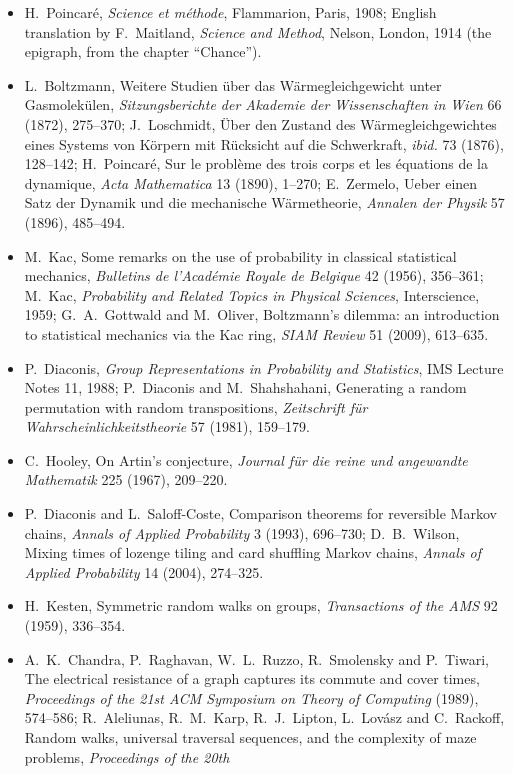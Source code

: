 \begin{itemize}
\item H.~Poincaré, \emph{Science et méthode}, Flammarion, Paris, 1908; English translation by F.~Maitland, \emph{Science and Method}, Nelson, London,
1914 (the epigraph, from the chapter ``Chance'').
\item L.~Boltzmann, Weitere Studien über das Wärmegleichgewicht unter Gasmolekülen, \emph{Sitzungsberichte der Akademie der Wissenschaften
in Wien} 66 (1872), 275--370; J.~Loschmidt, Über den Zustand des Wärmegleichgewichtes eines Systems von Körpern mit Rücksicht auf die
Schwerkraft, \emph{ibid.} 73 (1876), 128--142; H.~Poincaré, Sur le problème des trois corps et les équations de la dynamique, \emph{Acta
Mathematica} 13 (1890), 1--270; E.~Zermelo, Ueber einen Satz der Dynamik und die mechanische Wärmetheorie, \emph{Annalen der Physik} 57
(1896), 485--494.
\item M.~Kac, Some remarks on the use of probability in classical statistical mechanics, \emph{Bulletins de l'Académie Royale de Belgique} 42
(1956), 356--361; M.~Kac, \emph{Probability and Related Topics in Physical Sciences}, Interscience, 1959; G.~A.~Gottwald and M.~Oliver,
Boltzmann's dilemma: an introduction to statistical mechanics via the Kac ring, \emph{SIAM Review} 51 (2009), 613--635.
\item P.~Diaconis, \emph{Group Representations in Probability and Statistics}, IMS Lecture Notes 11, 1988; P.~Diaconis and M.~Shahshahani,
Generating a random permutation with random transpositions, \emph{Zeitschrift für Wahrscheinlichkeitstheorie} 57 (1981), 159--179.
\item C.~Hooley, On Artin's conjecture, \emph{Journal für die reine und angewandte Mathematik} 225 (1967), 209--220.
\item P.~Diaconis and L.~Saloff-Coste, Comparison theorems for reversible Markov chains, \emph{Annals of Applied Probability} 3 (1993),
696--730; D.~B.~Wilson, Mixing times of lozenge tiling and card shuffling Markov chains, \emph{Annals of Applied Probability} 14 (2004),
274--325.
\item H.~Kesten, Symmetric random walks on groups, \emph{Transactions of the AMS} 92 (1959), 336--354.
\item A.~K.~Chandra, P.~Raghavan, W.~L.~Ruzzo, R.~Smolensky and P.~Tiwari, The electrical resistance of a graph captures its commute and
cover times, \emph{Proceedings of the 21st ACM Symposium on Theory of Computing} (1989), 574--586; R.~Aleliunas, R.~M.~Karp, R.~J.~Lipton,
L.~Lovász and C.~Rackoff, Random walks, universal traversal sequences, and the complexity of maze problems, \emph{Proceedings of the 20th
}
\end{itemize}
